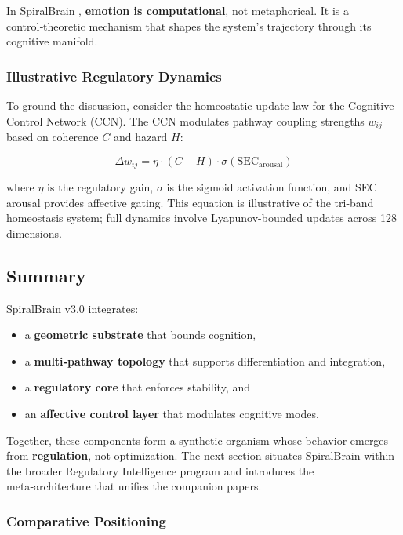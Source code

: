 \documentclass[12pt,a4paper]{report}
\begin{document}
In SpiralBrain \cite{SpiralBrainV3}, \textbf{emotion is computational}, not metaphorical. It is a control‑theoretic mechanism that shapes the system’s trajectory through its cognitive manifold.

\subsubsection{Illustrative Regulatory Dynamics}

To ground the discussion, consider the homeostatic update law for the Cognitive Control Network (CCN). The CCN modulates pathway coupling strengths $w_{ij}$ based on coherence $C$ and hazard $H$:

\[
\Delta w_{ij} = \eta \cdot (C - H) \cdot \sigma(\text{SEC}_\text{arousal})
\]

where $\eta$ is the regulatory gain, $\sigma$ is the sigmoid activation function, and SEC arousal provides affective gating. This equation is illustrative of the tri-band homeostasis system; full dynamics involve Lyapunov-bounded updates across 128 dimensions.

\subsection{Summary}

SpiralBrain v3.0 \cite{SpiralBrainV3} integrates:

\begin{itemize}
\item a \textbf{geometric substrate} that bounds cognition,  
\item a \textbf{multi‑pathway topology} that supports differentiation and integration,  
\item a \textbf{regulatory core} that enforces stability, and  
\item an \textbf{affective control layer} that modulates cognitive modes.
\end{itemize}

Together, these components form a synthetic organism whose behavior emerges from \textbf{regulation}, not optimization. The next section situates SpiralBrain \cite{SpiralBrainV3} within the broader Regulatory Intelligence program and introduces the meta‑architecture that unifies the companion papers.

\subsubsection{Comparative Positioning}
\end{document}

